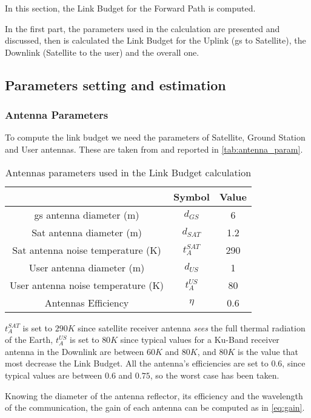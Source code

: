 In this section, the Link Budget for the Forward Path is computed.

In the first part, the parameters used in the calculation are presented and discussed, then is calculated the Link Budget for the Uplink (\gls{gs} to Satellite), the Downlink (Satellite to the user) and the overall one.
\subsection{Parameters setting and estimation}
	\subsubsection{Antenna Parameters}
		To compute the link budget we need the parameters of Satellite, Ground Station and User antennas. These are taken from \cite{Ippolito17} and reported in \autoref{tab:antenna_param}.

		\begin{table}[h]
			\centering
			\begin{tabular}{ccc}
			\toprule
			& Symbol & Value\\
			\midrule
			\gls{gs} antenna diameter (m) & $d_{GS}$ & 6\\
			Sat antenna diameter (m) & $d_{SAT}$  & 1.2\\
			Sat antenna noise temperature (K)& $t_A^{SAT}$ & 290\\
			User antenna diameter (m)& $d_{US}$ & 1\\
			User antenna noise temperature (K)& $t_A^{US}$ & 80\\
			Antennas Efficiency & $\eta$ & 0.6\\
			\bottomrule
			\end{tabular}
			\caption{Antennas parameters used in the Link Budget calculation}
			\label{tab:antenna_param}
		\end{table}

		$t_A^{SAT}$ is set to $290K$ since satellite receiver antenna \textit{sees} the full thermal radiation of the Earth, $t_A^{US}$ is set to $80K$ since typical values for a Ku-Band receiver antenna in the Downlink are between $60K$ and $80K$, and $80K$ is the value that most decrease the Link Budget.
		All the antenna's efficiencies are set to $0.6$, since typical values are between $0.6$ and $0.75$, so the worst case has been taken.

		Knowing the diameter of the antenna reflector, its efficiency and the wavelength of the communication, the gain of each antenna can be computed as in \autoref{eq:gain}.

